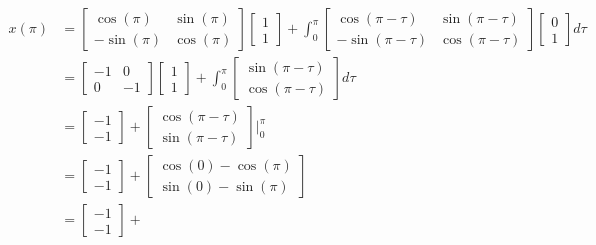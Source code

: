 \begin{example}
\begin{equation*}
\begin{split}
      x(\pi)&=
      \begin{bmatrix}
        \cos(\pi) & \sin(\pi) \\ -\sin(\pi) & \cos(\pi)
      \end{bmatrix}
      \begin{bmatrix}
        1 \\ 1
      \end{bmatrix}+
      \int_{0}^{\pi}
      \begin{bmatrix}
        \cos(\pi-\tau) & \sin(\pi-\tau) \\ -\sin(\pi-\tau) & \cos(\pi-\tau)
      \end{bmatrix}
      \begin{bmatrix}
        0 \\ 1
      \end{bmatrix}
      d\tau \\
      &=
      \begin{bmatrix}
        -1 & 0 \\ 0 & -1
      \end{bmatrix}
      \begin{bmatrix}
        1 \\ 1
      \end{bmatrix}+
      \int_{0}^{\pi}
      \begin{bmatrix}
        \sin(\pi-\tau) \\ \cos(\pi-\tau)
      \end{bmatrix}
      d\tau \\
      &=
      \begin{bmatrix}
        -1 \\ -1
      \end{bmatrix}+
      \begin{bmatrix}
        \cos(\pi-\tau) \\ \sin(\pi-\tau)
      \end{bmatrix} \Biggr|_{0}^{\pi} \\
      &=
      \begin{bmatrix}
        -1 \\ -1
      \end{bmatrix}+
      \begin{bmatrix}
        \cos(0)-\cos(\pi) \\ \sin(0)-\sin(\pi)
      \end{bmatrix} \\
      &=
      \begin{bmatrix}
        -1 \\ -1
      \end{bmatrix}+

\end{split}
\end{equation*}
\end{example}
